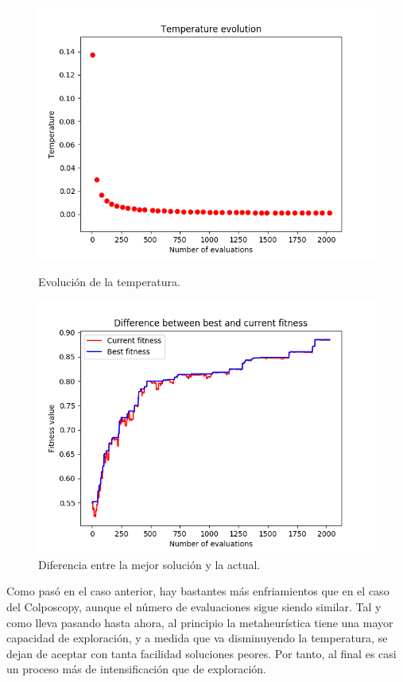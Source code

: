\documentclass[11pt,a4paper]{article}
\begin{document}
\begin{figure}[H]
\centering
\begin{minipage}{.5\textwidth}
	\centering
	\includegraphics[scale=0.4]{img/texture-sa-temp.png}
	\caption{Evolución de la temperatura.}
\end{minipage}%
\begin{minipage}{.5\textwidth}
	\centering
	\includegraphics[scale=0.4]{img/texture-sa.png}
	\caption{Diferencia entre la mejor solución y la actual.}
\end{minipage}
\end{figure}

Como pasó en el caso anterior, hay bastantes más enfriamientos que en el caso del Colposcopy, aunque el número de evaluaciones sigue
siendo similar. Tal y como lleva pasando hasta ahora, al principio la metaheurística tiene una mayor capacidad de exploración, y
a medida que va disminuyendo la temperatura, se dejan de aceptar con tanta facilidad soluciones peores. Por tanto, al final es
casi un proceso más de intensificación que de exploración.
\end{document}
